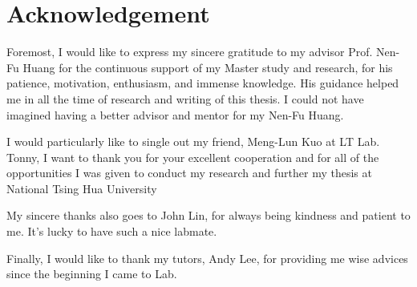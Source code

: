 \chapter*{Acknowledgement}
Foremost, I would like to express my sincere gratitude to my advisor Prof. Nen-Fu Huang for the continuous support of my Master study and research, for his patience, motivation, enthusiasm, and immense knowledge.
His guidance helped me in all the time of research and writing of this thesis.
I could not have imagined having a better advisor and mentor for my Nen-Fu Huang.

I would particularly like to single out my friend, Meng-Lun Kuo at LT Lab.
Tonny, I want to thank you for your excellent cooperation and for all of the opportunities I was given to conduct my research and further my thesis at National Tsing Hua University

My sincere thanks also goes to John Lin, for always being kindness and patient to me.
It's lucky to have such a nice labmate.

Finally, I would like to thank my tutors, Andy Lee, for providing me wise advices since the beginning I came to Lab. 

